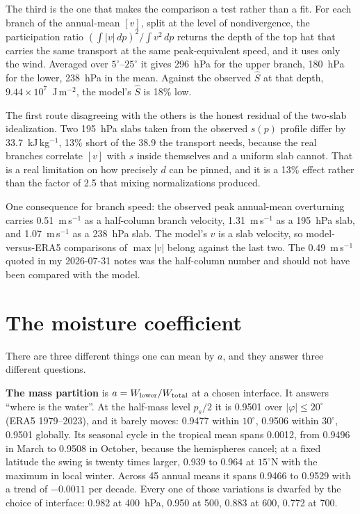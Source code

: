 \documentclass[11pt]{article}
\newcommand{\Shat}{\hat S}
\begin{document}
The third is the one that makes the comparison a test rather than a fit. For
each branch of the annual-mean $[v]$, split at the level of nondivergence, the
participation ratio $\left(\int|v|\,dp\right)^2 / \int v^2\,dp$ returns the
depth of the top hat that carries the same transport at the same
peak-equivalent speed, and it uses only the wind. Averaged over
$5^\circ$--$25^\circ$ it gives 296~hPa for the upper branch, 180~hPa for the
lower, 238~hPa in the mean. Against the observed $\Shat$ at that depth,
$9.44\times10^{7}$~J\,m$^{-2}$, the model's $\Shat$ is 18\% low.

The first route disagreeing with the others is the honest residual of the
two-slab idealization. Two 195~hPa slabs taken from the observed $s(p)$ profile
differ by 33.7~kJ\,kg$^{-1}$, 13\% short of the 38.9 the transport needs,
because the real branches correlate $[v]$ with $s$ inside themselves and a
uniform slab cannot. That is a real limitation on how precisely $d$ can be
pinned, and it is a 13\% effect rather than the factor of 2.5 that mixing
normalizations produced.

One consequence for branch speed: the observed peak annual-mean overturning
carries 0.51~m\,s$^{-1}$ as a half-column branch velocity, 1.31~m\,s$^{-1}$ as
a 195~hPa slab, and 1.07~m\,s$^{-1}$ as a 238~hPa slab. The model's $v$ is a
slab velocity, so model-versus-ERA5 comparisons of $\max|v|$ belong against the
last two. The 0.49~m\,s$^{-1}$ quoted in my 2026-07-31 notes was the
half-column number and should not have been compared with the model.

\section{The moisture coefficient}
\label{sec:a}

There are three different things one can mean by $a$, and they answer three
different questions.

\textbf{The mass partition} is $a = W_{\rm lower}/W_{\rm total}$ at a chosen
interface. It answers ``where is the water''. At the half-mass level $p_s/2$ it
is 0.9501 over $|\varphi|\le20^\circ$ (ERA5 1979--2023), and it barely moves:
0.9477 within $10^\circ$, 0.9506 within $30^\circ$, 0.9501 globally. Its
seasonal cycle in the tropical mean spans 0.0012, from 0.9496 in March to
0.9508 in October, because the hemispheres cancel; at a fixed latitude the
swing is twenty times larger, 0.939 to 0.964 at $15^\circ$N with the maximum in
local winter. Across 45 annual means it spans 0.9466 to 0.9529 with a trend of
$-0.0011$ per decade. Every one of those variations is dwarfed by the choice of
interface: 0.982 at 400~hPa, 0.950 at 500, 0.883 at 600, 0.772 at 700.
\end{document}
